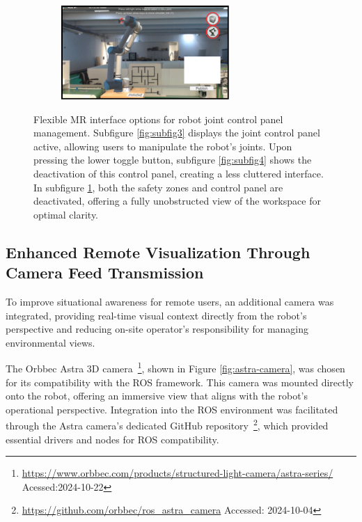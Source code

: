 \begin{figure}[h]
    \begin{subfigure}{\textwidth}
        \caption{}
        \centering
        \includegraphics[width=0.7\textwidth]{figs/feature-5.png}
        \label{fig:subfig5}
    \end{subfigure}

    \caption{Flexible \ac{MR} interface options for robot joint control panel management. Subfigure \ref{fig:subfig3} displays the joint control panel active, allowing users to manipulate the robot’s joints. Upon pressing the lower toggle button, subfigure \ref{fig:subfig4} shows the deactivation of this control panel, creating a less cluttered interface. In subfigure \ref{fig:subfig5}, both the safety zones and control panel are deactivated, offering a fully unobstructed view of the workspace for optimal clarity.}
    \label{fig:3-features-button}
\end{figure}



\subsection{Enhanced Remote Visualization Through Camera Feed Transmission}

To improve situational awareness for remote users, an additional camera was integrated, providing real-time visual context directly from the robot’s perspective and reducing on-site operator's responsibility for managing environmental views.

The Orbbec Astra 3D camera~\footnote{\url{https://www.orbbec.com/products/structured-light-camera/astra-series/} Acessed:2024-10-22}, shown in Figure \ref{fig:astra-camera}, was chosen for its compatibility with the \ac{ROS} framework. This camera was mounted directly onto the robot, offering an immersive view that aligns with the robot’s operational perspective. Integration into the \ac{ROS} environment was facilitated through the Astra camera’s dedicated GitHub repository~\footnote{\url{https://github.com/orbbec/ros\_astra\_camera} Accessed: 2024-10-04}, which provided essential drivers and nodes for \ac{ROS} compatibility.

